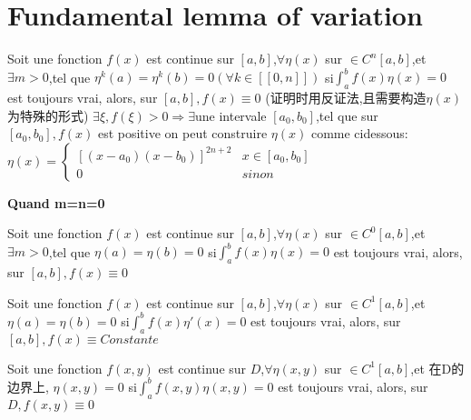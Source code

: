 \section{Fundamental lemma of variation}
\begin{theorem}
    Soit une fonction $f(x)$ est continue sur $[a,b]$,$ \forall \eta(x)$ sur $\in C^{n}[a,b]$,et $\exists m>0$,tel que $\eta^{k}(a)=\eta^{k}(b)=0 (\forall k \in [[0,n]])$ \newline
    si$ \int_{a}^{b}f(x)\eta(x)=0$ est toujours vrai, \newline
    alors, sur $[a,b],f(x)\equiv 0$ \newline
    (证明时用反证法,且需要构造$\eta(x)$为特殊的形式)
    $\exists \xi,f(\xi)>0 \Rightarrow \exists $une intervale $[a_0,b_0]$,tel que sur $[a_0,b_0],f(x)$ est positive \newline
 on peut construire $\eta(x)$ comme cidessous:
$\eta(x)=
    \left\{
      \begin{array}{ll}
        [(x-a_0)(x-b_0)]^{2n+2} & x \in [a_0,b_0] \\
        0 & sinon
      \end{array}
    \right.
    $
\end{theorem}


\textbf{Quand m=n=0}
\begin{theorem}
    Soit une fonction $f(x)$ est continue sur $[a,b]$,$ \forall \eta(x)$ sur $\in C^{0}[a,b]$,et $\exists m>0$,tel que $\eta(a)=\eta(b)=0$ \newline
    si$ \int_{a}^{b}f(x)\eta(x)=0$ est toujours vrai, \newline
    alors, sur $[a,b],f(x)\equiv 0$
\end{theorem}

\begin{theorem}
    Soit une fonction $f(x)$ est continue sur $[a,b]$,$ \forall \eta(x)$ sur $\in C^{1}[a,b]$,et $\eta(a)=\eta(b)=0$ \newline
    si$ \int_{a}^{b}f(x)\eta'(x)=0$ est toujours vrai, \newline
    alors, sur $[a,b],f(x)\equiv Constante$
\end{theorem}

\begin{theorem}
    Soit une fonction $f(x,y)$ est continue sur $D$,$ \forall \eta(x,y)$ sur $\in C^{1}[a,b]$,et 在D的边界上, $\eta(x,y)=0$\newline
    si$ \int_{a}^{b}f(x,y)\eta(x,y)=0$ est toujours vrai, \newline
    alors, sur $D,f(x,y)\equiv 0$
\end{theorem}
